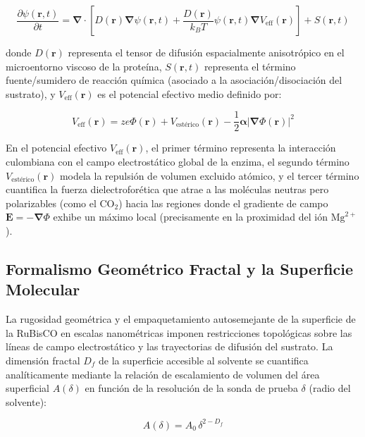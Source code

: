 \documentclass[12pt]{article}
\begin{document}
\begin{equation}
\frac{\partial \psi(\mathbf{r}, t)}{\partial t} = \mathbf{\nabla} \cdot \left[ D(\mathbf{r}) \mathbf{\nabla} \psi(\mathbf{r}, t) + \frac{D(\mathbf{r})}{k_B T} \psi(\mathbf{r}, t) \mathbf{\nabla} V_{\text{eff}}(\mathbf{r}) \right] + S(\mathbf{r}, t)
\end{equation}

donde $D(\mathbf{r})$ representa el tensor de difusión espacialmente anisotrópico en el microentorno viscoso de la proteína, $S(\mathbf{r}, t)$ representa el término fuente/sumidero de reacción química (asociado a la asociación/disociación del sustrato), y $V_{\text{eff}}(\mathbf{r})$ es el potencial efectivo medio definido por:

\begin{equation}
V_{\text{eff}}(\mathbf{r}) = z e \Phi(\mathbf{r}) + V_{\text{estérico}}(\mathbf{r}) - \frac{1}{2} \boldsymbol{\alpha} |\mathbf{\nabla} \Phi(\mathbf{r})|^2
\end{equation}

En el potencial efectivo $V_{\text{eff}}(\mathbf{r})$, el primer término representa la interacción culombiana con el campo electrostático global de la enzima, el segundo término $V_{\text{estérico}}(\mathbf{r})$ modela la repulsión de volumen excluido atómico, y el tercer término cuantifica la fuerza dielectroforética que atrae a las moléculas neutras pero polarizables (como el $\text{CO}_2$) hacia las regiones donde el gradiente de campo $\mathbf{E} = -\mathbf{\nabla}\Phi$ exhibe un máximo local (precisamente en la proximidad del ión $\text{Mg}^{2+}$).

\subsection{Formalismo Geométrico Fractal y la Superficie Molecular}

La rugosidad geométrica y el empaquetamiento autosemejante de la superficie de la RuBisCO en escalas nanométricas imponen restricciones topológicas sobre las líneas de campo electrostático y las trayectorias de difusión del sustrato. La dimensión fractal $D_f$ de la superficie accesible al solvente se cuantifica analíticamente mediante la relación de escalamiento de volumen del área superficial $A(\delta)$ en función de la resolución de la sonda de prueba $\delta$ (radio del solvente):

\begin{equation}
A(\delta) = A_0 \, \delta^{2 - D_f}
\end{equation}
\end{document}
